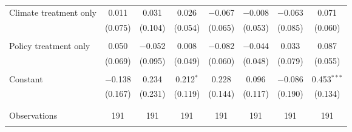 \begin{tabular}{@{\extracolsep{5pt}}lccccccc}
 Climate treatment only & 0.011 & 0.031 & 0.026 & $-$0.067 & $-$0.008 & $-$0.063 & 0.071 \\ 
  & (0.075) & (0.104) & (0.054) & (0.065) & (0.053) & (0.085) & (0.060) \\ 
  & & & & & & & \\ 
 Policy treatment only & 0.050 & $-$0.052 & 0.008 & $-$0.082 & $-$0.044 & 0.033 & 0.087 \\ 
  & (0.069) & (0.095) & (0.049) & (0.060) & (0.048) & (0.079) & (0.055) \\ 
  & & & & & & & \\ 
 Constant & $-$0.138 & 0.234 & 0.212$^{*}$ & 0.228 & 0.096 & $-$0.086 & 0.453$^{***}$ \\ 
  & (0.167) & (0.231) & (0.119) & (0.144) & (0.117) & (0.190) & (0.134) \\ 
  & & & & & & & \\ 
\hline \\[-1.8ex] 

Observations & 191 & 191 & 191 & 191 & 191 & 191 & 191 \\ 
\hline 
\hline \\[-1.8ex] 
\end{tabular} 
